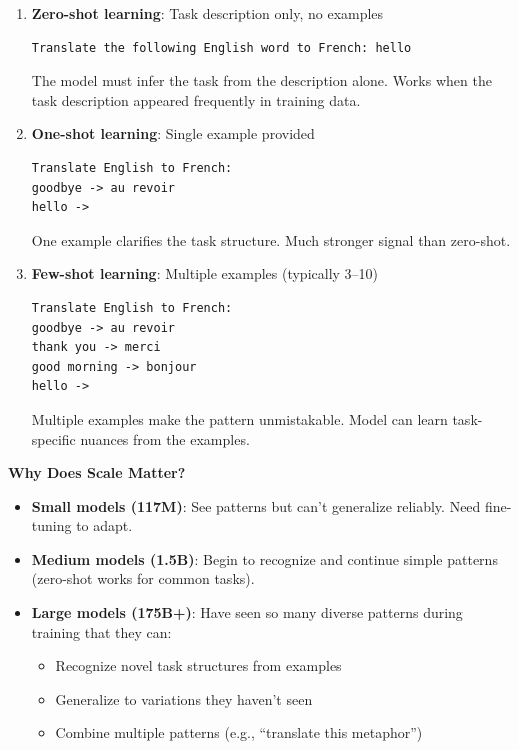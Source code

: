 \documentclass{article}
\begin{document}
\begin{enumerate}
\item \textbf{Zero-shot learning}: Task description only, no examples

\begin{verbatim}
Translate the following English word to French: hello
\end{verbatim}

The model must infer the task from the description alone. Works when the task description appeared frequently in training data.

\vspace{0.3cm}

\item \textbf{One-shot learning}: Single example provided

\begin{verbatim}
Translate English to French:
goodbye -> au revoir
hello ->
\end{verbatim}

One example clarifies the task structure. Much stronger signal than zero-shot.

\vspace{0.3cm}

\item \textbf{Few-shot learning}: Multiple examples (typically 3--10)

\begin{verbatim}
Translate English to French:
goodbye -> au revoir
thank you -> merci
good morning -> bonjour
hello ->
\end{verbatim}

Multiple examples make the pattern unmistakable. Model can learn task-specific nuances from the examples.
\end{enumerate}

\textbf{Why Does Scale Matter?}

\begin{itemize}
\item \textbf{Small models (117M)}: See patterns but can't generalize reliably. Need fine-tuning to adapt.

\item \textbf{Medium models (1.5B)}: Begin to recognize and continue simple patterns (zero-shot works for common tasks).

\item \textbf{Large models (175B+)}: Have seen so many diverse patterns during training that they can:
\begin{itemize}
\item Recognize novel task structures from examples
\item Generalize to variations they haven't seen
\item Combine multiple patterns (e.g., ``translate this metaphor'')
\end{itemize}
\end{itemize}
\end{document}
